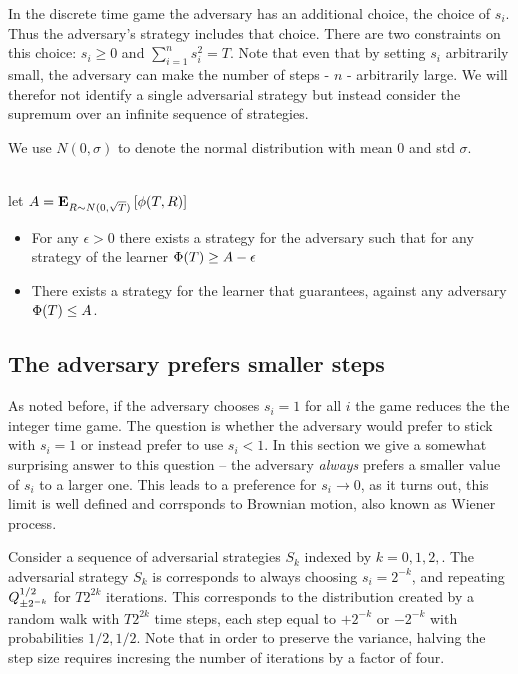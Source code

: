 \documentclass{article}[12pt]
\begin{document}
In the discrete time game the adversary has an additional choice, the
choice of $s_i$. Thus the adversary's strategy includes that choice.
There are two constraints on this choice: $s_i \geq 0$ and
$\sum_{i=1}^n s_i^2 = T$. Note that even that by setting $s_i$
arbitrarily small, the adversary can make the number of steps - $n$ -
arbitrarily large. We will therefor not identify a single adversarial
strategy but instead consider the supremum over an infinite sequence
of strategies.

We use $N(0,\sigma)$ to denote the normal distribution with mean 0 and
std $\sigma$.

\begin{theorem}
  ~\\

   let $A = {\bf E}_{R \sim N(0,\sqrt{T})}\left[ \phi(T,R) \right]$
   \begin{itemize}
     \item
    For any $\epsilon>0$ there exists a strategy for the adversary
    such that for any strategy of the learner $\Phi(T) \geq A-\epsilon$
  \item
    There exists a strategy for the learner that guarantees, against
    any adversary $\Phi(T) \leq A$.
  \end{itemize}
\end{theorem}


\subsection{The adversary prefers smaller steps} \label{sec:smallsteps}
As noted before, if the adversary chooses $s_i=1$ for all $i$ the game
reduces the the integer time game. The question is whether the
adversary would prefer to stick with $s_i=1$ or instead prefer to use
$s_i<1$. In this section we give a somewhat surprising answer to this question
-- the adversary {\em always} prefers a smaller value of $s_i$ to a larger
one. This leads to a preference for $s_i \to 0$, as it turns out, this
limit is well defined and corrsponds to Brownian motion, also known as
Wiener process.

Consider a sequence of adversarial strategies $S_k$ indexed by
$k=0,1,2,$. The adversarial strategy $S_k$ is corresponds to always
choosing $s_i = 2^{-k}$, and repeating  $Q^{1/2}_{\pm 2^{-k}}$ 
for $T 2^{2k}$ iterations.
This corresponds to the distribution created by a random walk with
$T 2^{2k}$ time steps, each step equal to $+2^{-k}$ or  $-2^{-k}$ with probabilities $1/2,1/2$.
Note that in order to preserve the variance, halving the step size
requires incresing the number of iterations by a factor of four.
\end{document}
